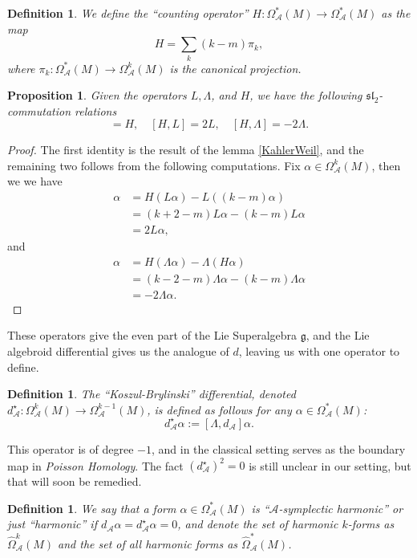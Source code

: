 \documentclass{amsart}
\newcommand{\ra}{\rightarrow}
\newtheorem{definition}[theorem]{Definition}
\newtheorem{prop}[theorem]{Proposition}
\newcommand{\A}{\mathcal{A}}
\theoremstyle{definition}
\begin{document}
\begin{definition}
    We define the ``counting operator'' $H:\Omega^*_\A(M) \ra \Omega^*_\A(M)$ as the map
    \begin{equation*}
        H= \sum_k (k-m)\pi_k,
    \end{equation*}
    where $\pi_k:\Omega^*_\A(M) \ra \Omega^k_\A(M)$ is the canonical projection.
\end{definition}
\begin{prop}\label{AlgebroidKahlerWeil}
    Given the operators $L,\Lambda$, and $H$, we have the following $\mathfrak{sl}_2$-commutation relations
    \begin{equation*}
       [L,\Lambda]=H, \quad [H,L]=2L, \quad [H,\Lambda]=-2\Lambda.
    \end{equation*}
\end{prop}
\begin{proof}
    The first identity is the result of the lemma \ref{KahlerWeil}, and the remaining two follows from the following computations. Fix  $\alpha \in \Omega^k_\A(M)$, then we we have
    \begin{align*}
        [H,L]\alpha &= H(L\alpha) - L( (k-m)\alpha) \\
        &= (k+2-m)L\alpha - (k-m) L\alpha \\
        &= 2L\alpha,
    \end{align*}
    and
    \begin{align*}
        [H,\Lambda]\alpha &= H(\Lambda \alpha) - \Lambda (H\alpha) \\
        &=(k-2-m)\Lambda\alpha - (k-m)\Lambda \alpha \\
        &=-2\Lambda \alpha.
    \end{align*}
\end{proof}
These operators give the even part of the Lie Superalgebra $\mathfrak{g}$, and the Lie algebroid differential gives us the analogue of $d$, leaving us with one operator to define.
\begin{definition}
    The ``Koszul-Brylinski'' differential, denoted $d_\A^\star:\Omega^k_\A(M) \ra \Omega_\A^{k-1}(M)$, is defined as follows for any $\alpha \in \Omega^*_\A(M)$:
    \begin{equation*}
        d_\A^\star\alpha := [\Lambda, d_\A]\alpha.
    \end{equation*}
\end{definition}
This operator is of degree $-1$, and in the classical setting serves as the boundary map in \textit{Poisson Homology}. The fact $(d^\star_\A)^2=0$ is still unclear in our setting, but that will soon be remedied.
\begin{definition}
    We say that a form $\alpha \in \Omega^*_\A(M)$ is ``$\A$-symplectic harmonic'' or just ``harmonic'' if $d_\A \alpha=d_\A^\star\alpha=0$, and denote the set of harmonic $k$-forms as $\widehat{\Omega}_\A^k(M)$ and the set of all harmonic forms as $\widehat{\Omega}_\A^*(M)$. 
\end{definition}
\end{document}
